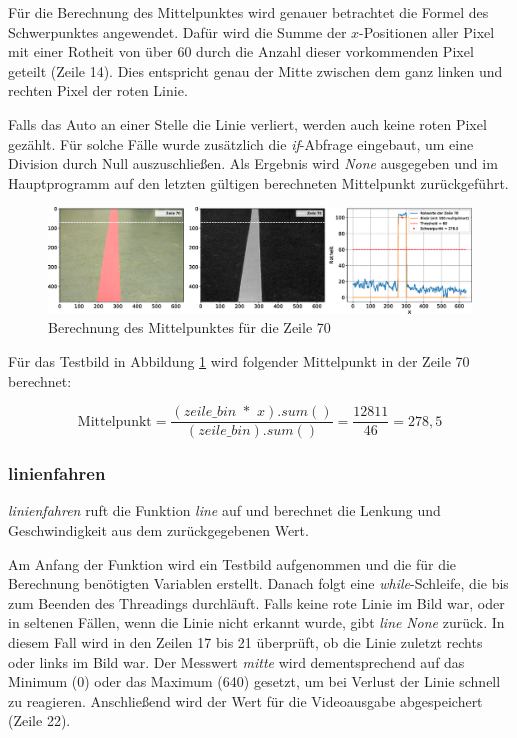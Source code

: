 \documentclass[a4paper, 12pt]{scrartcl}
\begin{document}
Für die Berechnung des Mittelpunktes wird genauer betrachtet die Formel des Schwerpunktes angewendet. Dafür wird die Summe der $x$-Positionen aller Pixel mit einer Rotheit von über 60 durch die Anzahl dieser vorkommenden Pixel geteilt (Zeile 14). Dies entspricht genau der Mitte zwischen dem ganz linken und rechten Pixel der roten Linie.

Falls das Auto an einer Stelle die Linie verliert, werden auch keine roten Pixel gezählt. Für solche Fälle wurde zusätzlich die \textit{if}-Abfrage eingebaut, um eine Division durch Null auszuschließen. Als Ergebnis wird \textit{None} ausgegeben und im Hauptprogramm auf den letzten gültigen berechneten Mittelpunkt zurückgeführt.
\begin{figure}[H] 
	\centering
	\includegraphics[width=1\textwidth]{Testbild.eps}
	\caption{Berechnung des Mittelpunktes für die Zeile 70}
	\label{mittelpunkt}
\end{figure}

Für das Testbild in Abbildung \ref{mittelpunkt} wird folgender Mittelpunkt in der Zeile 70 berechnet:

\begin{equation}
\text{Mittelpunkt} = \frac{ (\textit{zeile\_bin $*$ x}).\textit{sum}() }{ (\textit{zeile\_bin} ).\textit{sum}() } = \frac{12811}{46} = 278,5
\end{equation}

\newpage

\subsubsection{linienfahren}


\textit{linienfahren} ruft die Funktion \textit{line} auf und berechnet die Lenkung und Geschwindigkeit aus dem zurückgegebenen Wert.

Am Anfang der Funktion wird ein Testbild aufgenommen und die für die Berechnung benötigten Variablen erstellt. Danach folgt eine \textit{while}-Schleife, die bis zum Beenden des Threadings durchläuft.
Falls keine rote Linie im Bild war, oder in seltenen Fällen, wenn die Linie nicht erkannt wurde, gibt \textit{line} \textit{None} zurück. In diesem Fall wird in den Zeilen 17 bis 21 überprüft, ob die Linie zuletzt rechts oder links im Bild war. Der Messwert \textit{mitte} wird dementsprechend auf das Minimum (0) oder das Maximum (640) gesetzt, um bei Verlust der Linie schnell zu reagieren. Anschließend wird der Wert für die Videoausgabe abgespeichert (Zeile 22).
\end{document}
